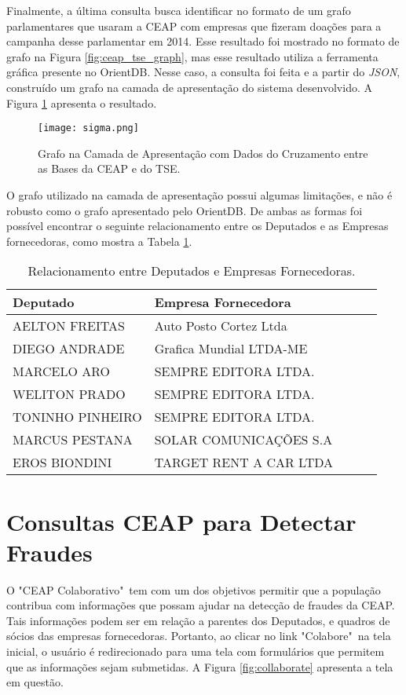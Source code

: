 Finalmente, a última consulta busca identificar no formato de um grafo parlamentares que usaram a CEAP com empresas que fizeram doações para a campanha desse parlamentar em 2014. Esse resultado foi mostrado no formato de grafo na Figura \ref{fig:ceap_tse_graph}, mas esse resultado utiliza a ferramenta gráfica presente no OrientDB. Nesse caso, a consulta foi feita e a partir do \textit{JSON}, construído um grafo na camada de apresentação do sistema desenvolvido. A Figura \ref{fig:sigma} apresenta o resultado.

\begin{figure}[H]
\centering
\texttt{[image: sigma.png]}
\caption{Grafo na Camada de Apresentação com Dados do Cruzamento entre as Bases da CEAP e do TSE.}
\label{fig:sigma}
\end{figure}

O grafo utilizado na camada de apresentação possui algumas limitações, e não é robusto como o grafo apresentado pelo OrientDB. De ambas as formas foi possível encontrar o seguinte relacionamento entre os Deputados e as Empresas fornecedoras, como mostra a Tabela \ref{table:relation_deputies_companies}.

\begin{table}[h!]
\centering
\caption{Relacionamento entre Deputados e Empresas Fornecedoras.}
\begin{tabular}{|l|l|l|l|l|}
\hline
Deputado & Empresa Fornecedora \\ \hline
AELTON FREITAS & Auto Posto Cortez Ltda \\ \hline
DIEGO ANDRADE & Grafica Mundial LTDA-ME \\ \hline
MARCELO ARO & SEMPRE EDITORA LTDA. \\ \hline
WELITON PRADO & SEMPRE EDITORA LTDA. \\ \hline
TONINHO PINHEIRO & SEMPRE EDITORA LTDA. \\ \hline
MARCUS PESTANA & SOLAR COMUNICAÇÕES S.A \\ \hline
EROS BIONDINI & TARGET RENT A CAR LTDA \\ \hline
\end{tabular}
\label{table:relation_deputies_companies}
\end{table}

\section{Consultas CEAP para Detectar Fraudes}

O "CEAP Colaborativo"\ tem com um dos objetivos permitir que a população contribua com informações que possam ajudar na detecção de fraudes da CEAP. Tais informações podem ser em relação a parentes dos Deputados, e quadros de sócios das empresas fornecedoras. Portanto, ao clicar no link "Colabore"\ na tela inicial, o usuário é redirecionado para uma tela com formulários que permitem que as informações sejam submetidas. A Figura \ref{fig:collaborate} apresenta a tela em questão.

